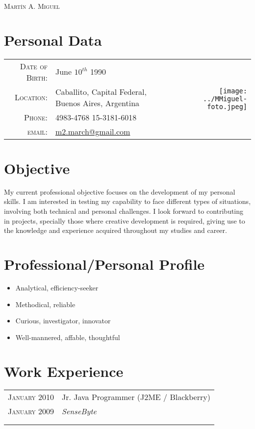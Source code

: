 \documentclass[a4paper,10pt]{article}
\newcommand{\workEntry}[5]{
\begin{tabular}{p{1.5cm}|p{11cm}}
\raggedleft \textsc{#1} & #3 \\
\raggedleft \textsc{#2} & \emph{#4} \\
& \footnotesize{#5}\\
\multicolumn{2}{c}{}\ %
\end{tabular}
}
\begin{document}
\par{\centering
{\huge{\textsc{Mart\'in A. Miguel}} }
\bigskip\par}

\section{Personal Data}
\begin{tabular}[c]{rp{7.5cm}r}
\textsc{Date of Birth:} & June $10^{th}$ 1990 & \multirow{4}{*}{\texttt{[image: ../MMiguel-foto.jpeg]}}\\
\textsc{Location:}	& Caballito, Capital Federal, \newline Buenos Aires, Argentina & \\
\textsc{Phone:}	& 4983-4768 15-3181-6018 & \\
\textsc{email:}	& \href{mailto:m2.march@gmail.com}{m2.march@gmail.com} & \\

\end{tabular}

\section{Objective}
My current professional objective focuses on the development of my personal skills. I am interested in testing my capability to face different types of situations, involving both technical and personal challenges. I look forward to contributing in projects, specially those where creative development is required, giving use to the knowledge and experience acquired throughout my studies and career.

\section{Professional/Personal Profile}
\begin{itemize}
 \item Analytical, efficiency-seeker
 \item Methodical, reliable 
 \item Curious, investigator, innovator
 \item Well-mannered, affable, thoughtful
\end{itemize}

\section{Work Experience}
\workEntry{January 2010}{January 2009}{Jr. Java Programmer (J2ME / Blackberry)}{SenseByte}{}
\end{document}
